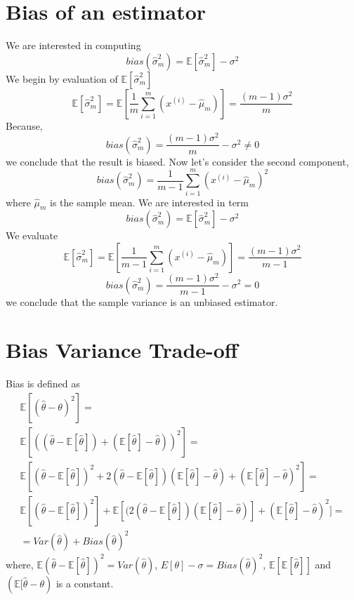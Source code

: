 \documentclass[12pt]{article}
\newcommand{\hattheta}{\hat{\theta}}
\newcommand{\hatmintexpect}{\hattheta - \mathbb{E}[\hattheta]}
\newcommand{\expectmintheta}{\mathbb{E}[\hattheta]- \hattheta}
\begin{document}
\section{Bias of an estimator}

We are interested in computing
\begin{equation}
bias(\hat{\sigma}_m^2) = \mathbb{E}[\hat{\sigma}_m^2] - \sigma^2
\end{equation}
We begin by evaluation of $\mathbb{E}[\hat{\sigma}_m^2]$
\begin{equation}
\mathbb{E}[\hat{\sigma}_m^2] = \mathbb{E}[\frac{1}{m} \sum_{i=1}^{m} (x^{(i)} - \hat{\mu}_m)] = \frac{(m-1)\sigma^2}{m}
\end{equation}
Because,
\begin{equation}
bias(\hat{\sigma}_m^2) = \frac{(m-1)\sigma^2}{m} - \sigma^{2} \neq 0
\end{equation}
we conclude that the result is biased.
Now let's consider the second component,
\begin{equation}
bias(\hat{\sigma}_m^2) = \frac{1}{m-1}\sum_{i=1}^{m} (x^{(i)} - \hat{\mu}_m)^2
\end{equation}
where $\hat{\mu}_m$ is the sample mean. We are interested in term
\begin{equation}
bias(\hat{\sigma}_m^2) = \mathbb{E}[\hat{\sigma}_m^2] - \sigma^2
\end{equation}
We evaluate
\begin{equation}
 \mathbb{E}[\hat{\sigma}_m^2] =  \mathbb{E}[\frac{1}{m-1}\sum_{i=1}^{m} (x^{(i)} - \hat{\mu}_m)] = \frac{(m-1)\sigma^2}{m-1}
\end{equation}
\begin{equation}
bias(\hat{\sigma}_m^2) = \frac{(m-1)\sigma^2}{m-1} - \sigma^2 = 0
\end{equation}
we conclude that the sample variance is an unbiased estimator.

\section{Bias Variance Trade-off}
Bias is defined as
\begin{equation}
\begin{array}{l}
\mathbb{E}[(\hattheta - \theta)^2] = \\
\mathbb{E}[((\hatmintexpect) + (\expectmintheta))^2] = \\
\mathbb{E}[(\hatmintexpect)^2 + 2(\hatmintexpect)(\expectmintheta) + (\expectmintheta)^2] = \\
\mathbb{E}[(\hatmintexpect)^2] + \mathbb{E}[(2(\hatmintexpect)(\expectmintheta)] + (\expectmintheta)^2] = \\
= Var(\hattheta)+ Bias(\hattheta)^2
\end{array}
\end{equation}
where, $\mathbb{E}(\hatmintexpect)^2 = Var(\hattheta)$, $E[\theta] - \sigma =  Bias(\hattheta)^2$, $\mathbb{E}[\mathbb{E}[\hattheta]]$ and $(\mathbb{E}[\hattheta - \theta) $ is a constant.
\end{document}

